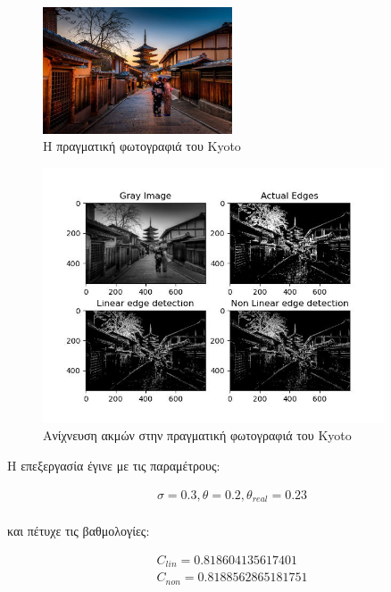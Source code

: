 \documentclass{article}
\newcommand{\eng}[1]{\foreignlanguage{english}{#1}}
\begin{document}
\begin{figure}[h]
    \centering
    \includegraphics[width=0.5\textwidth]{image-plots/kyoto_edges.jpg}
    \caption{Η πραγματική φωτογραφιά του \eng{Kyoto}}
    \label{fig:kyoto}
\end{figure}
\begin{figure}[h]
    \centering
    \includegraphics[width=0.9\textwidth]{image-plots/edges-real.jpg}
    \caption{Ανίχνευση ακμών στην πραγματική φωτογραφιά του \eng{Kyoto}}
    \label{fig:kyoto-edges}
\end{figure}
\FloatBarrier

Η επεξεργασία έγινε με τις παραμέτρους:

\begin{equation}
    \begin{gathered}
        \sigma = 0.3, \theta = 0.2, \theta_{real} = 0.23 \\
    \end{gathered}
\end{equation}

και πέτυχε τις βαθμολογίες:

\begin{equation}
    \begin{gathered}
        C_{lin} = 0.818604135617401\\
        C_{non} = 0.8188562865181751
    \end{gathered}
\end{equation}
\end{document}
